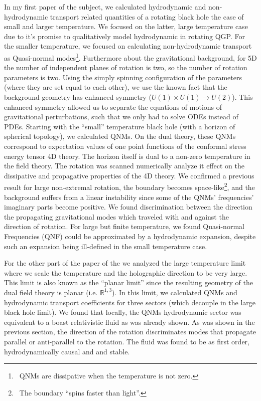 \documentclass[12pt]{article}
\begin{document}
In my first paper of the subject, we calculated hydrodynamic and non-hydrodynamic transport related quantities of a rotating black hole the case of small and larger temperature.
We focused on the latter, large temperature case due to it's promise to qualitatively model hydrodynamic in rotating QGP.
For the smaller temperature, we focused on calculating non-hydrodynamic transport as Quasi-normal modes\footnote{\
  QNMs are dissipative when the temperature is not zero.
}.
Furthermore about the gravitational background, for 5D the number of independent planes of rotation is two, so the number of rotation parameters is two.
Using the simply spinning configuration of the parameters (where they are set equal to each other), we use the known fact that the background geometry has enhanced symmetry ($U(1)\times U(1) \rightarrow U(2)$).
This enhanced symmetry allowed us to separate the equations of motions of gravitational perturbations, such that we only had to solve ODEs instead of PDEs.
Starting with the ``small'' temperature black hole (with a horizon of spherical topology), we calculated QNMs.
On the dual theory, these QNMs correspond to expectation values of one point functions of the conformal stress energy tensor 4D theory.
The horizon itself is dual to a non-zero temperature in the field theory.
The rotation was scanned numerically analyze it effect on the dissipative and propagative properties of the 4D theory.
We confirmed a previous result for large non-extremal rotation, the boundary becomes space-like\footnote{\
  The boundary ``spins faster than light''.
}, 
and the background suffers from a linear instability since some of the QNMs' frequencies' imaginary parts become positive.
We found discrimination between the direction the propagating gravitational modes which traveled with and against the direction of rotation.
For large but finite temperature, we found Quasi-normal Frequencies (QNF) could be approximated by a hydrodynamic expansion, despite such an expansion being ill-defined in the small temperature case.

For the other part of the paper of the we analyzed the large temperature limit where we scale the temperature and the holographic direction to be very large.
This limit is also known as the ``planar limit'' since the resulting geometry of the dual field theory is planar (i.e. $\mathds{R}^{1,3}$). 
In this limit, we calculated QNMs and hydrodynamic transport coefficients for three sectors (which decouple in the large black hole limit).
We found that locally, the QNMs hydrodynamic sector was equivalent to a boast relativistic fluid as was already shown.
As was shown in the previous section, the direction of the rotation discriminates modes that propagate parallel or anti-parallel to the rotation.
The fluid was found to be as first order, hydrodynamically causal and and stable.
\end{document}
